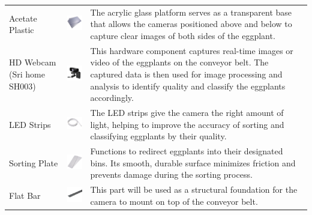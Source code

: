 {\begin{longtable}{
		>{\centering\arraybackslash}m{3cm}  
		>{\centering\arraybackslash}m{4cm} 
		>{\arraybackslash}m{6cm}
	}
	Acetate Plastic &
	\includegraphics[width=3cm]{figures/acetate} &
	The acrylic glass platform serves as a transparent base that allows the cameras positioned above and below to capture clear images of both sides of the eggplant. \\
	
	HD Webcam (Sri home SH003) &
	\includegraphics[width=3cm]{figures/camera} &
	This hardware component captures real-time images or video of the eggplants on the conveyor belt. The captured data is then used for image processing and analysis to identify quality and classify the eggplants accordingly. \\
	
	LED Strips &
	\includegraphics[width=3cm]{figures/led} &
	The LED strips give the camera the right amount of light, helping to improve the accuracy of sorting and classifying eggplants by their quality. \\
	
	Sorting Plate &
	\includegraphics[width=3cm]{figures/plate} &
	Functions to redirect eggplants into their designated bins. Its smooth, durable surface minimizes friction and prevents damage during the sorting process. \\
	
	Flat Bar&
	\includegraphics[width=3cm]{figures/flat_bar} &
	This part will be used as a structural foundation for the camera to mount on top of the conveyor belt. \\
	

\end{longtable}}
